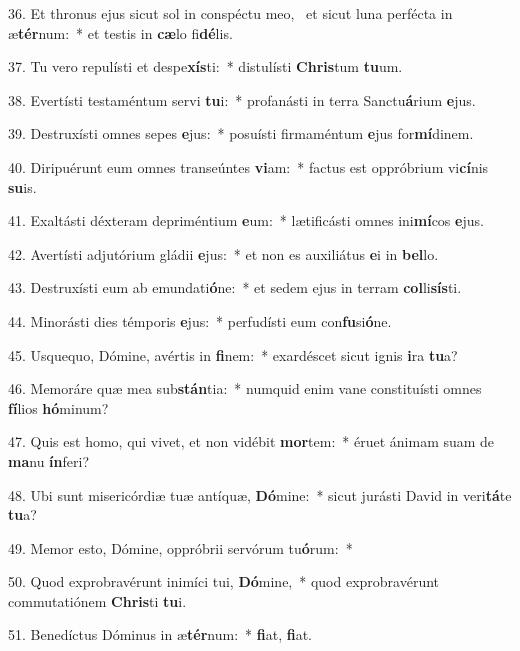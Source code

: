 36. Et thronus ejus sicut sol in conspéctu meo, \dag\  et sicut luna perfécta in æ\textbf{tér}num:~*  et testis in \textbf{cæ}lo fi\textbf{dé}lis.\

37. Tu vero repulísti et despe\textbf{xís}ti:~*  distulísti \textbf{Chris}tum \textbf{tu}um.\

38. Evertísti testaméntum servi \textbf{tu}i:~*  profanásti in terra Sanctu\textbf{á}rium \textbf{e}jus.\

39. Destruxísti omnes sepes \textbf{e}jus:~*  posuísti firmaméntum \textbf{e}jus for\textbf{mí}dinem.\

40. Diripuérunt eum omnes transeúntes \textbf{vi}am:~*  factus est oppróbrium vi\textbf{cí}nis \textbf{su}is.\

41. Exaltásti déxteram depriméntium \textbf{e}um:~*  lætificásti omnes ini\textbf{mí}cos \textbf{e}jus.\

42. Avertísti adjutórium gládii \textbf{e}jus:~*  et non es auxiliátus \textbf{e}i in \textbf{bel}lo.\

43. Destruxísti eum ab emundati\textbf{ó}ne:~*  et sedem ejus in terram \textbf{col}li\textbf{sís}ti.\

44. Minorásti dies témporis \textbf{e}jus:~*  perfudísti eum con\textbf{fu}si\textbf{ó}ne.\

45. Usquequo, Dómine, avértis in \textbf{fi}nem:~*  exardéscet sicut ignis \textbf{i}ra \textbf{tu}a?\

46. Memoráre quæ mea sub\textbf{stán}tia:~*  numquid enim vane constituísti omnes \textbf{fí}lios \textbf{hó}minum?\

47. Quis est homo, qui vivet, et non vidébit \textbf{mor}tem:~*  éruet ánimam suam de \textbf{ma}nu \textbf{ín}feri?\

48. Ubi sunt misericórdiæ tuæ antíquæ, \textbf{Dó}mine:~*  sicut jurásti David in veri\textbf{tá}te \textbf{tu}a?\

49. Memor esto, Dómine, oppróbrii servórum tu\textbf{ó}rum:~*  \

50. Quod exprobravérunt inimíci tui, \textbf{Dó}mine,~*  quod exprobravérunt commutatiónem \textbf{Chris}ti \textbf{tu}i.\

51. Benedíctus Dóminus in æ\textbf{tér}num:~*  \textbf{fi}at, \textbf{fi}at.\

